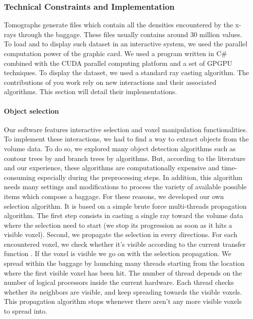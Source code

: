 \subsubsection{Technical Constraints and Implementation}

Tomographs generate files which contain all the densities encountered by the x-rays through the baggage. These files usually contains around 30 million values. To load and to display such dataset in an interactive system, we used the parallel computation power of the graphic card. We used a program written in C\# combined with the CUDA parallel computing platform and a set of GPGPU techniques. To display the dataset, we used a standard ray casting algorithm. The contributions of you work rely on new interactions and their associated algorithms. This section will detail their implementations.

\paragraph{Object selection}

Our software features interactive selection and voxel manipulation functionalities. To implement these interactions, we had to find a way to extract objects from the volume data. To do so, we explored many object detection algorithms such as contour trees by \cite{carr_computing_2000} and branch trees by \cite{pascucci_multi-resolution_2004} algorithms. But, according to the literature and our experience, these algorithms are computationally expensive and time-consuming especially during the preprocessing steps. In addition, this algorithm needs many settings and modifications to process the variety of available possible items which compose a baggage. For these reasons, we developed our own selection algorithm. It is based on a simple brute force multi-threads propagation algorithm. The first step consists in casting a single ray toward the volume data where the selection need to start (we stop its progression as soon as it hits a visible voxel). Second, we propagate the selection in every directions. For each encountered voxel, we check whether it’s visible according to the current transfer function . If the voxel is visible we go on with the selection propagation. We spread within the baggage by launching many threads starting from the location where the first visible voxel has been hit. The number of thread depends on the number of logical processors inside the current hardware. Each thread checks whether its neighbors are visible, and keep spreading towards the visible voxels. This propagation algorithm stops whenever there aren’t any more visible voxels to spread into.


